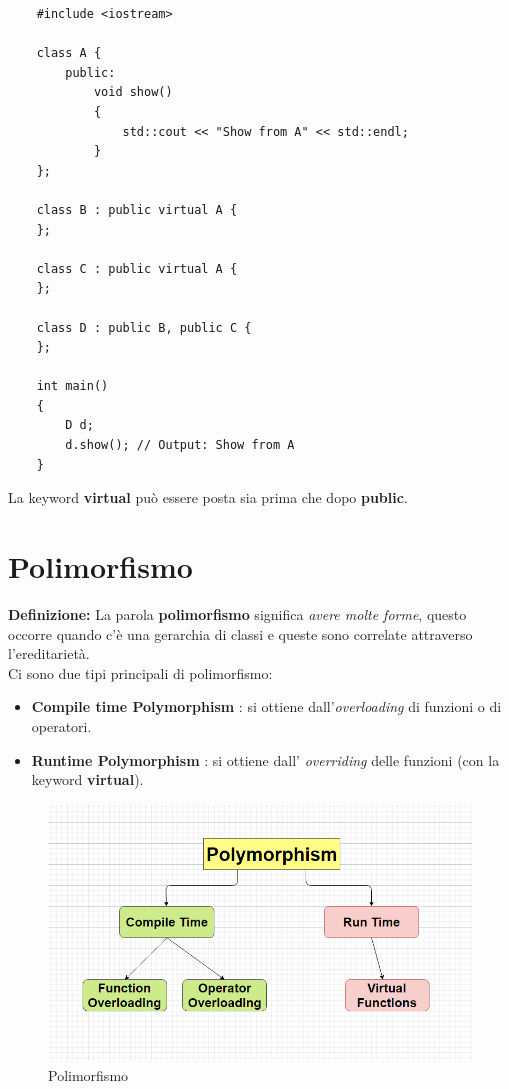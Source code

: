 \begin{lstlisting}
	#include <iostream>
	
	class A {
		public:
			void show()
			{
				std::cout << "Show from A" << std::endl;
			}
	};

	class B : public virtual A {
	};

	class C : public virtual A {
	};

	class D : public B, public C {
	};

	int main()
	{
		D d;
		d.show(); // Output: Show from A
	}
\end{lstlisting}

\textsf{\small La keyword \textbf{virtual} può essere posta sia prima che dopo \textbf{public}.} \\



\section{Polimorfismo}

\textsf{\small \textbf{Definizione:} La parola \textbf{polimorfismo} significa \emph{avere molte forme}, questo occorre quando c'è una gerarchia di classi e queste sono correlate attraverso l'ereditarietà.} \\

\textsf{\small Ci sono due tipi principali di polimorfismo: }

\begin{itemize}
	\item \textsf{\small \textbf{Compile time Polymorphism} : si ottiene dall'\emph{overloading} di funzioni o di operatori.}
	\item \textsf{\small \textbf{Runtime Polymorphism} : si ottiene dall' \emph{overriding} delle funzioni (con la keyword \textbf{virtual}).}
\end{itemize}

\begin{figure}[H]
	\centering
	\includegraphics[width=1\textwidth, height=1\textheight, keepaspectratio]{./imgs/polymorphism.png}
	\caption{Polimorfismo}
	\label{fig:polymorphism}
\end{figure}

